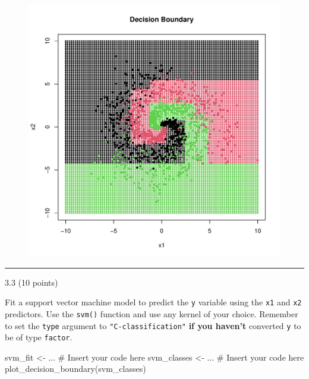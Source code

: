 \documentclass[
  letterpaper,
  DIV=11,
  numbers=noendperiod]{scrartcl}
\newenvironment{Shaded}{\begin{snugshade}}{\end{snugshade}}
\newcommand{\CommentTok}[1]{\textcolor[rgb]{0.37,0.37,0.37}{#1}}
\newcommand{\FunctionTok}[1]{\textcolor[rgb]{0.28,0.35,0.67}{#1}}
\newcommand{\NormalTok}[1]{\textcolor[rgb]{0.00,0.23,0.31}{#1}}
\newcommand{\OtherTok}[1]{\textcolor[rgb]{0.00,0.23,0.31}{#1}}
\begin{document}
\begin{figure}[H]

{\centering \includegraphics{hw5_files/figure-pdf/unnamed-chunk-28-1.pdf}

}

\end{figure}

\begin{center}\rule{0.5\linewidth}{0.5pt}\end{center}

3.3 (10 points)

Fit a support vector machine model to predict the \texttt{y} variable
using the \texttt{x1} and \texttt{x2} predictors. Use the \texttt{svm()}
function and use any kernel of your choice. Remember to set the
\texttt{type} argument to \texttt{"C-classification"} \textbf{if you
haven't} converted \texttt{y} to be of type \texttt{factor}.

\begin{Shaded}
\begin{Highlighting}[]
\NormalTok{svm\_fit }\OtherTok{\textless{}{-}}\NormalTok{ ... }\CommentTok{\# Insert your code here}
\NormalTok{svm\_classes }\OtherTok{\textless{}{-}}\NormalTok{ ... }\CommentTok{\# Insert your code here}
\FunctionTok{plot\_decision\_boundary}\NormalTok{(svm\_classes)}
\end{Highlighting}
\end{Shaded}
\end{document}
